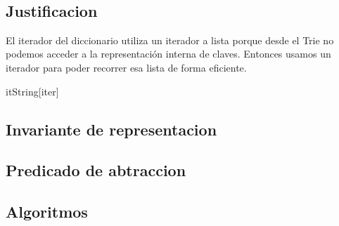 \begin{Representacion}
~  


\subsection{Justificacion}
El iterador del diccionario utiliza un iterador a lista porque desde el Trie no podemos acceder a la representaci\'on interna de claves. Entonces usamos un iterador para poder recorrer esa lista de forma eficiente.

\begin{Estructura}{itString}[iter]
	\begin{Tupla}[iter]
	\end{Tupla}
\end{Estructura}

\subsection{Invariante de representacion}

\subsection{Predicado de abtraccion}

\end{Representacion}

\subsection{Algoritmos}

